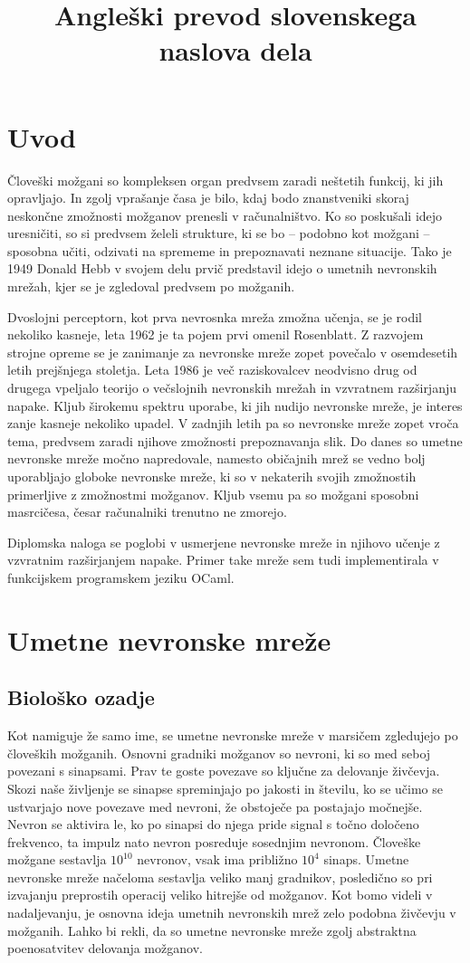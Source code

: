 \documentclass[mat1]{fmfdelo}
\title{Angleški prevod slovenskega naslova dela}
\begin{document}
%
\section{Uvod}
%
Človeški možgani so kompleksen organ predvsem zaradi neštetih funkcij, ki jih opravljajo. In zgolj vprašanje časa je bilo, kdaj bodo znanstveniki skoraj neskončne zmožnosti možganov prenesli v računalništvo. Ko so poskušali idejo uresničiti, so si predvsem želeli strukture, ki se bo -- podobno kot možgani -- sposobna učiti, odzivati na sprememe in prepoznavati neznane situacije. Tako je 1949 Donald Hebb v svojem delu prvič predstavil idejo o umetnih nevronskih mrežah, kjer se je zgledoval predvsem po možganih. 

Dvoslojni perceptorn, kot prva nevrosnka mreža zmožna učenja, se je rodil nekoliko kasneje, leta 1962 je ta pojem prvi omenil Rosenblatt. Z razvojem strojne opreme se je zanimanje za nevronske mreže zopet povečalo v osemdesetih letih prejšnjega stoletja. Leta 1986 je več raziskovalcev neodvisno drug od drugega vpeljalo teorijo o večslojnih nevronskih mrežah in vzvratnem razširjanju napake. Kljub širokemu spektru uporabe, ki jih nudijo nevronske mreže, je interes zanje kasneje nekoliko upadel. V zadnjih letih pa so nevronske mreže zopet vroča tema, predvsem zaradi njihove zmožnosti prepoznavanja slik. Do danes so umetne nevronske mreže močno napredovale, namesto običajnih mrež se vedno bolj uporabljajo globoke nevronske mreže, ki so v nekaterih svojih zmožnostih primerljive z zmožnostmi možganov. Kljub vsemu pa so možgani sposobni masrcičesa, česar računalniki trenutno ne zmorejo.

Diplomska naloga se poglobi v usmerjene nevronske mreže in njihovo učenje z vzvratnim razširjanjem napake. Primer take mreže sem tudi implementirala v funkcijskem programskem jeziku OCaml. 
%
\section{Umetne nevronske mreže}
%
%
\subsection{Biološko ozadje}
Kot namiguje že samo ime, se umetne nevronske mreže v marsičem zgledujejo po človeških možganih. Osnovni gradniki možganov so nevroni, ki so med seboj povezani s sinapsami. Prav te goste povezave so ključne za delovanje živčevja. Skozi naše življenje se sinapse spreminjajo po jakosti in številu, ko se učimo se ustvarjajo nove povezave med nevroni, že obstoječe pa postajajo močnejše. Nevron se aktivira le,  ko po sinapsi do njega pride signal s točno določeno frekvenco, ta impulz nato nevron posreduje sosednjim nevronom. Človeške možgane sestavlja $10^{10}$ nevronov, vsak  ima približno $10^4$ sinaps. Umetne nevronske mreže načeloma sestavlja veliko manj gradnikov, posledično so pri izvajanju preprostih operacij veliko hitrejše od možganov. Kot bomo videli v nadaljevanju, je osnovna ideja umetnih nevronskih mrež zelo podobna živčevju v možganih. Lahko bi rekli, da so umetne nevronske mreže zgolj abstraktna poenosatvitev delovanja možganov. 
%
\end{document}
